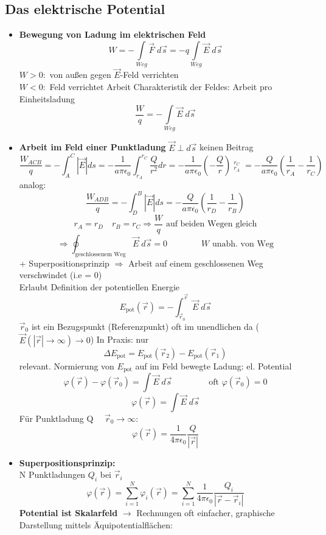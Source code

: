 \documentclass[titlepage,12pt,a4paper,ngerman]{report}
\newcommand{\tx}[1]{\textrm{#1}}
\begin{document}
\subsection{Das elektrische Potential}
\begin{itemize}
\item \textbf{Bewegung von Ladung im elektrischen Feld}
$$ W = -\int\limits_{Weg} \vec{F} \; d\vec{s} = -q \int\limits_{Weg} \vec{E} \;d\vec{s}$$
$ W>0:$ von außen gegen $\vec{E}$-Feld verrichten\\
$ W<0:$ Feld verrichtet Arbeit
Charakteristik der Feldes: Arbeit pro Einheitsladung
$$\frac{W}{q} = -\int\limits_{Weg} \vec{E}\;d\vec{s}$$
\item \textbf{Arbeit im Feld einer Punktladung}
$ \vec{E} \perp d\vec{s}$ keinen Beitrag
$$ \frac{W_{ACB}}{q} = -\int_{A}^C |\vec{E}| ds = -\dfrac{1}{a\pi\epsilon_0} \int_{r_A}^{r_C} \frac{Q}{r^2} dr =  -\dfrac{1}{a\pi\epsilon_0} (-\frac{Q}{r}) \mathop{\bigg|}_{r_A}^{r_C} =  -\dfrac{Q}{a\pi\epsilon_0} ( \frac{1}{r_A} - \frac{1}{r_C})$$
analog:
$$\frac{W_{ADB}}{q} = -\int_D^B |\vec{E}| ds =  -\dfrac{Q}{a\pi\epsilon_0} ( \frac{1}{r_D} - \frac{1}{r_B})$$
$$r_A = r_D \quad r_B = r_C \Rightarrow \frac{W}{q} \textrm{ auf beiden Wegen gleich}$$
$$\Rightarrow \oint_{\textrm{geschlossenem Weg}} \vec{E}\; d\vec{s} = 0 \qquad \qquad W \textrm{ unabh. von Weg}$$
+ Superpositionsprinzip $\Rightarrow$ Arbeit auf einem geschlossenen Weg verschwindet (i.e = 0)\\
Erlaubt Definition der potentiellen Energie
$$ E_{\tx{pot}} (\vec{r}) = -\int_{\vec{r}_0}^{\vec{r}} \vec{E} \; d\vec{s} $$
$\vec{r}_0$ ist ein Bezugspunkt (Referenzpunkt) oft im unendlichen da ($\vec{E}( |\vec{r}| \rightarrow \infty) \rightarrow 0$)
In Praxis: nur
$$ \Delta E_{\tx{pot}} = E_{\tx{pot}}(\vec{r}_2) - E_{\tx{pot}}(\vec{r}_1)$$
relevant.
Normierung von $E_{\tx{pot}}$ auf im Feld bewegte Ladung:
el. Potential 
$$\varphi(\vec{r}) - \varphi (\vec{r}_0) = \int \vec{E} \; d \vec{s} \qquad \qquad \textrm{ oft } \varphi(\vec{r}_0) = 0$$
$$\varphi(\vec{r}) = \int \vec{E} \; d \vec{s}$$
Für Punktladung Q $\quad \vec{r}_0 \rightarrow \infty :$ $$\varphi(\vec{r}) = \frac{1}{4\pi\epsilon_0} \frac{Q}{|\vec{r}|}$$
\item \textbf{Superpositionsprinzip:}\\
N Punktladungen $Q_i$ bei $\vec{r}_i$
$$ \varphi(\vec{r}) = \sum_{i=1}^N \varphi_i(\vec{r}) = \sum_{i=1}^N \frac{1}{4\pi\epsilon_0} \frac{Q_i}{|\vec{r}-\vec{r}_i|}$$
\textbf{Potential ist Skalarfeld} $\rightarrow$ Rechnungen oft einfacher, graphische Darstellung mittels Äquipotentialflächen: \\

\end{itemize}
\end{document}
